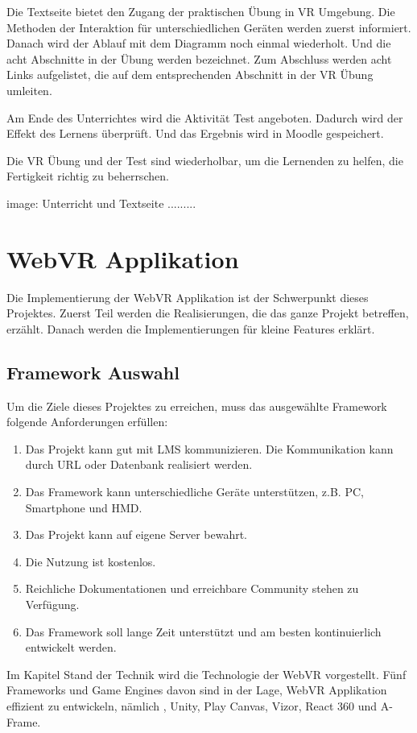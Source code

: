  Die Textseite bietet den Zugang der praktischen Übung in VR Umgebung. Die Methoden der Interaktion für unterschiedlichen Geräten werden zuerst informiert. Danach wird der Ablauf mit dem Diagramm noch einmal wiederholt. Und die acht Abschnitte in der Übung werden bezeichnet. Zum Abschluss werden acht Links aufgelistet, die auf dem entsprechenden Abschnitt in der VR Übung umleiten.
 
 Am Ende des Unterrichtes wird die Aktivität Test angeboten. Dadurch wird der Effekt des Lernens überprüft. Und das Ergebnis wird in Moodle gespeichert.
 
 Die VR Übung und der Test sind wiederholbar, um die Lernenden zu helfen, die Fertigkeit richtig zu beherrschen.
 
 image: Unterricht und Textseite .........
 
\section{WebVR Applikation}
Die Implementierung der WebVR Applikation ist der Schwerpunkt dieses Projektes. Zuerst Teil werden die Realisierungen, die das ganze Projekt betreffen, erzählt. Danach werden die Implementierungen für kleine Features erklärt.

 \subsection{Framework Auswahl}
 
 Um die Ziele dieses Projektes zu erreichen, muss das ausgewählte Framework folgende Anforderungen erfüllen:
 
 \begin{enumerate}
     \item Das Projekt kann gut mit LMS kommunizieren. Die Kommunikation kann durch URL oder Datenbank realisiert werden.
     \item Das Framework kann unterschiedliche Geräte unterstützen, z.B. PC, Smartphone und HMD.
     \item Das Projekt kann auf eigene Server bewahrt.
     \item Die Nutzung ist kostenlos.
     \item Reichliche Dokumentationen und erreichbare Community stehen zu Verfügung.
     \item Das Framework soll lange Zeit unterstützt und am besten kontinuierlich entwickelt werden.
 \end{enumerate}
 
 Im Kapitel Stand der Technik wird die Technologie der WebVR vorgestellt. Fünf Frameworks und Game Engines davon sind in der Lage, WebVR Applikation effizient zu entwickeln, nämlich , Unity, Play Canvas, Vizor, React 360 und A-Frame.
 
